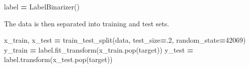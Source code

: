 \documentclass[
]{article}
\newenvironment{Shaded}{\begin{snugshade}}{\end{snugshade}}
\newcommand{\DecValTok}[1]{\textcolor[rgb]{0.00,0.00,0.81}{#1}}
\newcommand{\FloatTok}[1]{\textcolor[rgb]{0.00,0.00,0.81}{#1}}
\newcommand{\NormalTok}[1]{#1}
\newcommand{\OperatorTok}[1]{\textcolor[rgb]{0.81,0.36,0.00}{\textbf{#1}}}
\newcommand{\StringTok}[1]{\textcolor[rgb]{0.31,0.60,0.02}{#1}}
\begin{document}
\begin{Shaded}
\begin{Highlighting}[]
\NormalTok{label }\OperatorTok{=}\NormalTok{ LabelBinarizer()}
\end{Highlighting}
\end{Shaded}

The data is then separated into training and test sets.

\begin{Shaded}
\begin{Highlighting}[]
\NormalTok{x\_train, x\_test }\OperatorTok{=}\NormalTok{ train\_test\_split(data, test\_size}\OperatorTok{=}\FloatTok{.2}\NormalTok{, random\_state}\OperatorTok{=}\DecValTok{42069}\NormalTok{)}
\NormalTok{y\_train }\OperatorTok{=}\NormalTok{ label.fit\_transform(x\_train.pop(}\StringTok{\textquotesingle{}target\textquotesingle{}}\NormalTok{))}
\NormalTok{y\_test }\OperatorTok{=}\NormalTok{ label.transform(x\_test.pop(}\StringTok{\textquotesingle{}target\textquotesingle{}}\NormalTok{))}
\end{Highlighting}
\end{Shaded}
\end{document}
